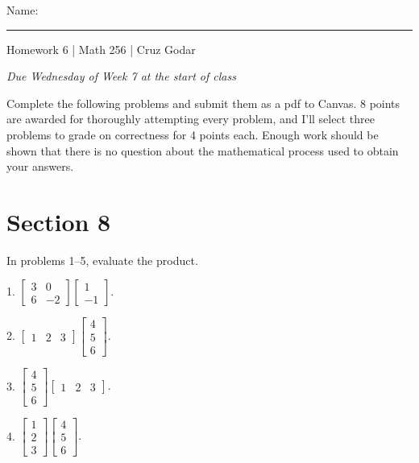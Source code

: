 \documentclass{article}
\begin{document}
\Large Name: \rule{2in}{0.15mm} \hfill Homework 6 | Math 256 | Cruz Godar \vspace{4pt}  \normalsize

\textit{Due Wednesday of Week 7 at the start of class}

Complete the following problems and submit them as a pdf to Canvas. 8 points are awarded for thoroughly attempting every problem, and I'll select three problems to grade on correctness for 4 points each. Enough work should be shown that there is no question about the mathematical process used to obtain your answers.

\section{Section 8}

In problems 1--5, evaluate the product.

1. $\displaystyle \left[\begin{array}{cc}3& 0 \\ 6& -2\end{array}\right]\left[\begin{array}{c}1 \\ -1\end{array}\right].$

2. $\displaystyle \left[\begin{array}{ccc}1& 2& 3\end{array}\right]\left[\begin{array}{c}4 \\ 5 \\ 6\end{array}\right].$

3. $\displaystyle \left[\begin{array}{c}4 \\ 5 \\ 6\end{array}\right]\left[\begin{array}{ccc}1& 2& 3\end{array}\right].$

4. $\displaystyle \left[\begin{array}{c}1 \\ 2 \\ 3\end{array}\right]\left[\begin{array}{c}4 \\ 5 \\ 6\end{array}\right].$
\end{document}
